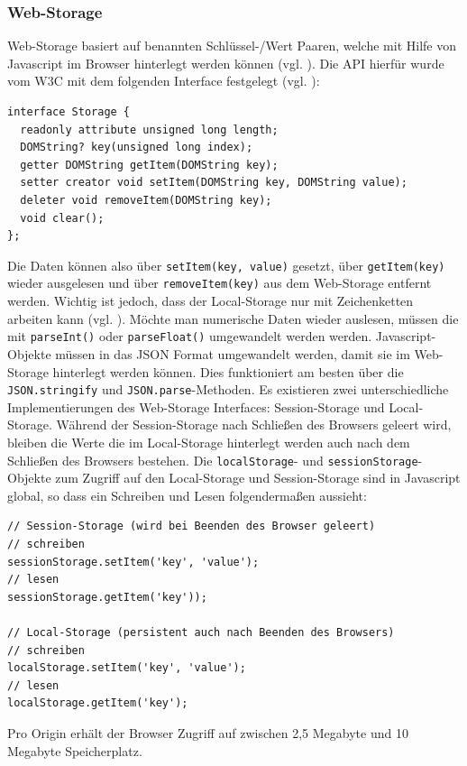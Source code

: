 \subsubsection*{Web-Storage}
Web-Storage basiert auf benannten Schlüssel-/Wert Paaren, welche mit Hilfe von Javascript im Browser hinterlegt werden können (vgl. \cite{html5upandrunningchapter7}). Die API hierfür wurde vom W3C mit dem folgenden Interface festgelegt (vgl. \cite{W3C2011}):
\begin{lstlisting}
interface Storage {
  readonly attribute unsigned long length;
  DOMString? key(unsigned long index);
  getter DOMString getItem(DOMString key);
  setter creator void setItem(DOMString key, DOMString value);
  deleter void removeItem(DOMString key);
  void clear();
};
\end{lstlisting}
Die Daten können also über \texttt{setItem(key, value)} gesetzt, über \texttt{getItem(key)} wieder ausgelesen und über \texttt{removeItem(key)} aus dem Web-Storage entfernt werden. Wichtig ist jedoch, dass der Local-Storage nur mit Zeichenketten arbeiten kann (vgl. \cite{W3C2011}). Möchte man numerische Daten wieder auslesen, müssen die mit \texttt{parseInt()} oder \texttt{parseFloat()} umgewandelt werden werden. Javascript-Objekte müssen in das JSON Format umgewandelt werden, damit sie im Web-Storage hinterlegt werden können. Dies funktioniert am besten über die \texttt{JSON.stringify} und \texttt{JSON.parse}-Methoden. Es existieren zwei unterschiedliche Implementierungen des Web-Storage Interfaces: Session-Storage und Local-Storage. Während der Session-Storage nach Schließen des Browsers geleert wird, bleiben die Werte die im Local-Storage hinterlegt werden auch nach dem Schließen des Browsers bestehen. Die \texttt{localStorage}- und \texttt{sessionStorage}-Objekte zum Zugriff auf den Local-Storage und Session-Storage sind in Javascript global, so dass ein Schreiben und Lesen folgendermaßen aussieht:
\begin{lstlisting}
// Session-Storage (wird bei Beenden des Browser geleert)
// schreiben
sessionStorage.setItem('key', 'value');
// lesen 
sessionStorage.getItem('key'));

// Local-Storage (persistent auch nach Beenden des Browsers)
// schreiben
localStorage.setItem('key', 'value');
// lesen
localStorage.getItem('key');
\end{lstlisting}
Pro Origin erhält der Browser Zugriff auf zwischen 2,5 Megabyte und 10 Megabyte Speicherplatz.

